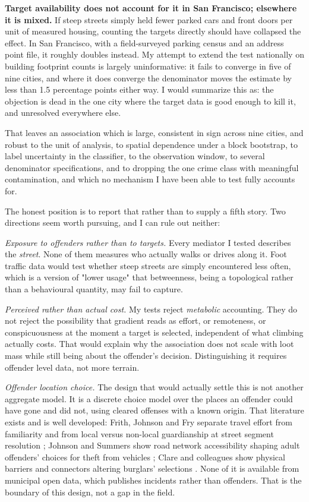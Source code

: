 \documentclass[12pt,letterpaper]{article}
\begin{document}
\textbf{Target availability does not account for it in San Francisco; elsewhere it is
mixed.} If steep streets simply held fewer parked cars and front doors per unit of
measured housing, counting the targets directly should have collapsed the effect. In
San Francisco, with a field-surveyed parking census and an address point file, it
roughly doubles instead. My attempt to extend the test nationally on building
footprint counts is largely uninformative: it fails to converge in five of nine
cities, and where it does converge the denominator moves the estimate by less than
1.5 percentage points either way. I would summarize this as: the objection is dead in
the one city where the target data is good enough to kill it, and unresolved
everywhere else.

That leaves an association which is large, consistent in sign across nine cities, and
robust to the unit of analysis, to spatial dependence under a block bootstrap, to
label uncertainty in the classifier, to the observation window, to several denominator
specifications, and to dropping the one crime class with meaningful contamination, and
which no mechanism I have been able to test fully accounts for.

The honest position is to report that rather than to supply a fifth story. Two
directions seem worth pursuing, and I can rule out neither:

\emph{Exposure to offenders rather than to targets.} Every mediator I tested describes
the \emph{street}. None of them measures who actually walks or drives along it.
Foot traffic data would test whether steep streets are simply encountered less often,
which is a version of "lower usage" that betweenness, being a topological rather than
a behavioural quantity, may fail to capture.

\emph{Perceived rather than actual cost.} My tests reject \emph{metabolic}
accounting. They do not reject the possibility that gradient reads as effort, or
remoteness, or conspicuousness at the moment a target is selected, independent of what
climbing actually costs. That would explain why the association does not scale with loot
mass while still being about the offender's decision. Distinguishing it requires
offender level data, not more terrain.

\emph{Offender location choice.} The design that would actually settle this is not
another aggregate model. It is a discrete choice model over the places an offender
could have gone and did not, using cleared offenses with a known origin. That
literature exists and is well developed: Frith, Johnson and Fry separate travel effort
from familiarity and from local versus non-local guardianship at street segment
resolution \citep{frith2017}; Johnson and Summers show road network accessibility
shaping adult offenders' choices for theft from vehicles \citep{johnsonsummers2015};
Clare and colleagues show physical barriers and connectors altering burglars'
selections \citep{clare2009}. None of it is available from municipal open data, which
publishes incidents rather than offenders. That is the boundary of this design, not a
gap in the field.
\end{document}
